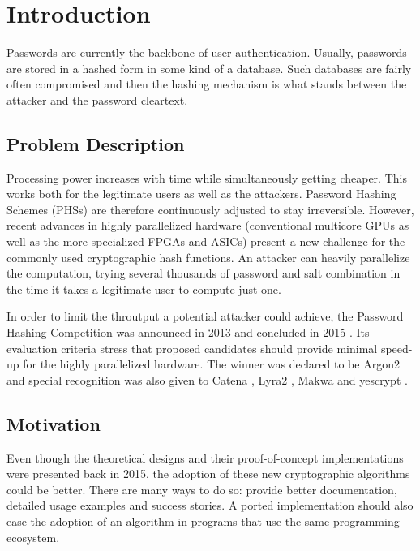 \chapter{Introduction}
\label{sec:introduction}
Passwords are currently the backbone of user authentication. Usually, passwords are stored in a hashed form in some kind of a database. Such databases are fairly often compromised and then the hashing mechanism is what stands between the attacker and the password cleartext.

\section{Problem Description}
Processing power increases with time while simultaneously getting cheaper. This works both for the legitimate users as well as the attackers. Password Hashing Schemes (PHSs) are therefore continuously adjusted to stay irreversible. However, recent advances in highly parallelized hardware (conventional multicore GPUs as well as the more specialized FPGAs and ASICs) present a new challenge for the commonly used cryptographic hash functions. An attacker can heavily parallelize the computation, trying several thousands of password and salt combination in the time it takes a legitimate user to compute just one.

In order to limit the throutput a potential attacker could achieve, the Password Hashing Competition was announced in 2013 and concluded in 2015 \cite{wetzels:2016:phc}. Its evaluation criteria stress that proposed candidates should provide minimal speed-up for the highly parallelized hardware. The winner was declared to be Argon2 \cite{biryukov:2015:argon2} and special recognition was also given to Catena \cite{forler:2013:catena}, Lyra2 \cite{andrade:2016:lyra2,marcos:2015:lyra2}, Makwa \cite{pornin:2015:makwa} and yescrypt \cite{peslyak:2015:yescrypt}.

\section{Motivation}
Even though the theoretical designs and their proof-of-concept implementations were presented back in 2015, the adoption of these new cryptographic algorithms could be better. There are many ways to do so: provide better documentation, detailed usage examples and success stories. A ported implementation should also ease the adoption of an algorithm in programs that use the same programming ecosystem.

